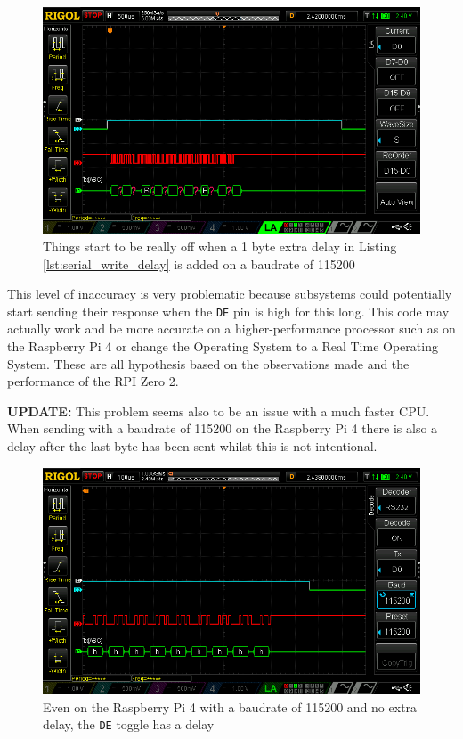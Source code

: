 \begin{figure}[H]
    \includegraphics[scale=0.4]{figures/Scope_Extra_Delay115200.png}
    \caption{Things start to be really off when a 1 byte extra delay in Listing \ref{lst:serial_write_delay} is added on a baudrate of 115200}
    \label{fig:scope_extra_delay115200}
\end{figure}

This level of inaccuracy is very problematic because subsystems could potentially start sending their response when the \texttt{DE} pin is high for this long.
This code may actually work and be more accurate on a higher-performance processor such as on the Raspberry Pi 4 or change the Operating System to a  Real Time Operating System.
These are all hypothesis based on the observations made and the performance of the RPI Zero 2. \newline


\textbf{UPDATE:} This problem seems also to be an issue with a much faster CPU.
When sending with a baudrate of 115200 on the Raspberry Pi 4 there is also a delay after the last byte has been sent whilst this is not intentional.


\begin{figure}[H]
    \includegraphics[scale=0.4]{figures/Scope_No_Delay115200_RPI4.png}
    \caption{Even on the Raspberry Pi 4 with a baudrate of 115200 and no extra delay, the \texttt{DE} toggle has a delay}
    \label{fig:scope_no_delay115200_rpi4}
\end{figure}

